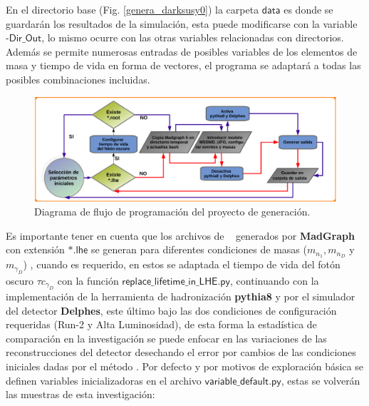 En el directorio base (Fig. \ref{genera_darksusy0}) la carpeta $\textsf{data}$ es donde se guardarán los resultados de la simulación, esta puede modificarse con la variable $\textsf{-Dir\_Out}$, lo mismo ocurre con las otras variables relacionadas con directorios. Además se permite numerosas entradas de posibles variables de los elementos de masa y tiempo de vida en forma de vectores, el programa se adaptará a todas las posibles combinaciones incluidas. 

\begin{figure}[!ht]
\centering
\includegraphics[width=1\textwidth]{Simulacion/imagenes/proyecto_darksusy2.png}
\caption{Diagrama de flujo de programación del proyecto de generación.}
\label{genera_darksusy2}
\end{figure}

Es importante tener en cuenta que los archivos de \MC ~ generados por \textbf{MadGraph} con extensión $\textsf{*.lhe}$ se generan para diferentes condiciones de masas ($m_{n_1}, m_{n_D}$ y  $m_{\gamma_D}$)%
, cuando  es requerido, en estos se adaptada el tiempo de vida del fotón oscuro $\tau c_{\gamma_D}$ %
con la función $\textsf{replace\_lifetime\_in\_LHE.py}$, continuando con la implementación de la herramienta de hadronización \textbf{pythia8} y por el simulador del detector \textbf{Delphes}, este último bajo las dos condiciones de configuración requeridas (Run-2 y Alta Luminosidad), de esta forma la estadística de comparación en la investigación se puede enfocar en las variaciones de las reconstrucciones del detector desechando el error por cambios de las condiciones iniciales dadas por el método \MC. 
Por defecto y por motivos de exploración básica se definen variables inicializadoras en el archivo $\textsf{variable\_default.py}$, estas se volverán las muestras de esta investigación:

